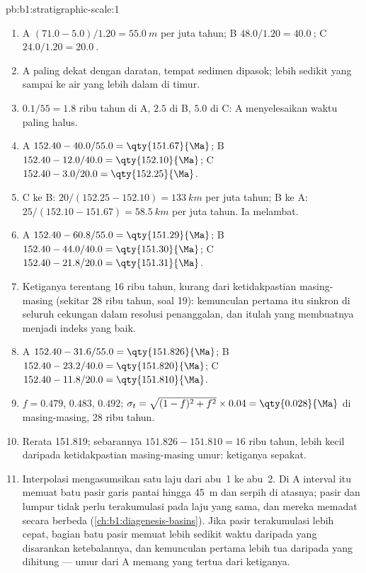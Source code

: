 \begin{solution}{pb:b1:stratigraphic-scale:1}
\begin{enumerate}
        (abu~1 di bawah abu~2 di setiap penampang, yang memeriksa korelasinya).
  \item A $(71.0 - 5.0)/1.20 = \qty{55.0}{m}$ per juta tahun; B
        $48.0/1.20 = \qty{40.0}{}$; C $24.0/1.20 = \qty{20.0}{}$.
  \item A paling dekat dengan daratan, tempat sedimen dipasok; lebih sedikit yang sampai ke
        air yang lebih dalam di timur.
  \item $0.1/55 = \num{1.8}$ ribu tahun di A, $\num{2.5}$ di B, $\num{5.0}$
        di C: A menyelesaikan waktu paling halus.
  \item A $152.40 - 40.0/55.0 = \qty{151.67}{\Ma}$; B $152.40 - 12.0/40.0 =
        \qty{152.10}{\Ma}$; C $152.40 - 3.0/20.0 = \qty{152.25}{\Ma}$.
  \item C ke B: $20/(152.25 - 152.10) = \qty{133}{km}$ per juta tahun; B ke A:
        $25/(152.10 - 151.67) = \qty{58.5}{km}$ per juta tahun. Ia melambat.
  \item A $152.40 - 60.8/55.0 = \qty{151.29}{\Ma}$; B $152.40 - 44.0/40.0 =
        \qty{151.30}{\Ma}$; C $152.40 - 21.8/20.0 = \qty{151.31}{\Ma}$.
  \item Ketiganya terentang \num{16} ribu tahun, kurang dari ketidakpastian masing-masing
        (sekitar \num{28} ribu tahun, soal 19): kemunculan pertama itu sinkron di seluruh
        cekungan dalam resolusi penanggalan, dan itulah yang membuatnya menjadi indeks yang baik.
  \item A $152.40 - 31.6/55.0 = \qty{151.826}{\Ma}$; B $152.40 - 23.2/40.0 =
        \qty{151.820}{\Ma}$; C $152.40 - 11.8/20.0 = \qty{151.810}{\Ma}$.
  \item $f = 0.479$, $0.483$, $0.492$; $\sigma_t = \sqrt{(1 - f)^2 + f^2} \times
        0.04 = \qty{0.028}{\Ma}$ di masing-masing, \num{28} ribu tahun.
  \item Rerata \qty{151.819}{\Ma}; sebarannya $151.826 - 151.810 = \num{16}$ ribu
        tahun, lebih kecil daripada ketidakpastian masing-masing umur: ketiganya sepakat.
  \item Interpolasi mengasumsikan satu laju dari abu~1 ke abu~2. Di A interval itu memuat
        batu pasir garis pantai hingga \qty{45}{m} dan serpih di atasnya; pasir dan lumpur tidak
        perlu terakumulasi pada laju yang sama, dan mereka memadat secara berbeda
        (\cref{ch:b1:diagenesis-basins}). Jika pasir terakumulasi lebih cepat, bagian batu pasir
        memuat lebih sedikit waktu daripada yang disarankan ketebalannya, dan kemunculan
        pertama lebih tua daripada yang dihitung --- umur dari A memang yang tertua dari ketiganya.

\end{enumerate}
\end{solution}
